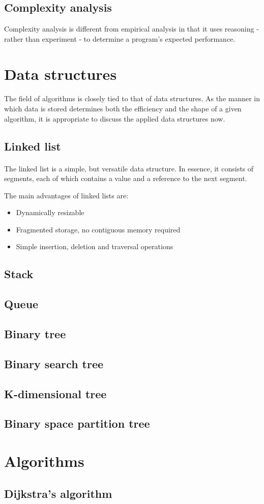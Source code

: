 \documentclass{article}
\begin{document}
\subsection{Complexity analysis}
Complexity analysis is different from empirical analysis in that it uses reasoning
- rather than experiment - to determine a program's expected performance.

\section{Data structures}
\paragraph{}
The field of algorithms is closely tied to that of data structures. As the manner in which data is stored determines both the efficiency and the shape of a given algorithm, it is appropriate to discuss the applied data structures now.

\subsection{Linked list}
\paragraph{}
The linked list is a simple, but versatile data structure.
In essence, it consists of segments, each of which contains a value and a reference to the next segment.

The main advantages of linked lists are:
\begin{itemize}
\item Dynamically resizable
\item Fragmented storage, no contiguous memory required
\item Simple insertion, deletion and traversal operations
\end{itemize}

\subsection{Stack}
\subsection{Queue}
\subsection{Binary tree}
\subsection{Binary search tree}
\subsection{K-dimensional tree}
\subsection{Binary space partition tree}


\section{Algorithms}
\subsection{Dijkstra's algorithm}

\newpage{}
\end{document}

